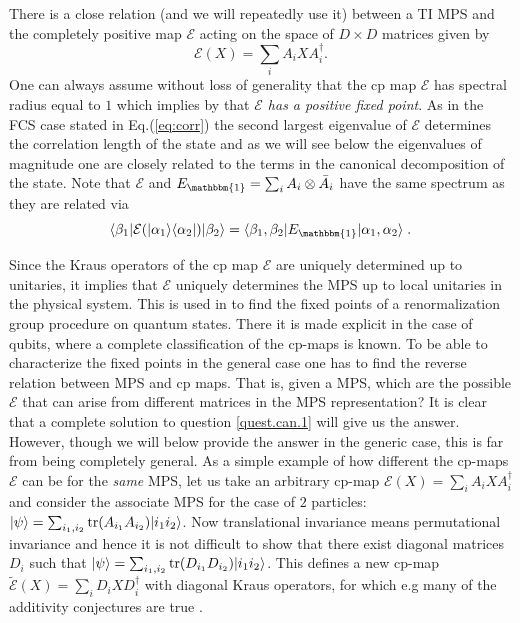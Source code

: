\documentclass[aps,prl,epsfig,graphics,floatfix,mathbbm,a4paper]{article}
\newcommand{\E}{\mathcal{E}}
\newcommand{\1}{\mathbbm{1}}
\renewcommand{\>}{\rangle}
\newcommand{\<}{\langle}
\begin{document}
There is a close relation (and we will repeatedly use it) between
a TI MPS
and the completely positive map $\E$ acting on the space of
$D\times D$ matrices given by
\begin{equation}\label{eq.E}
    \E(X)=\sum_iA_iXA_i^{\dagger}.
\end{equation}
One can always assume without loss of generality that the cp map
$\E$ has spectral radius equal to $1$ which implies by
\cite[Theorem 2.5]{EvansH-Krohn78} that \textit{$\E$ has a
    positive fixed point}. As in the FCS case stated in
Eq.(\ref{eq:corr}) the second largest eigenvalue of $\E$
determines the correlation length of the state and as we will see
below the eigenvalues of magnitude one are closely related to the
terms in the canonical decomposition of the state. Note that $\E$
and $E_\mathbbm{1}=\sum_i A_i\otimes \bar{A}_i$ have the same
spectrum as they are related via \begin{equation}\label{E2E}
    \langle \beta_1|\E(|\alpha_1\rangle\langle
    \alpha_2|)|\beta_2\rangle
    =\langle\beta_1,\beta_2|E_\mathbbm{1}|\alpha_1,\alpha_2\rangle\;.
\end{equation}

Since the Kraus operators of the cp map $\E$ are uniquely
determined up to unitaries, it implies that $\E$ uniquely
determines the MPS up to local unitaries in the physical system.
This is used in \cite{renorm} to find the fixed points of a
renormalization group procedure on quantum states. There it is
made explicit in the case of qubits, where a complete
classification of the cp-maps is known. To be able to characterize
the fixed points in the general case one has to find the reverse
relation between MPS and cp maps. That is, given a MPS, which are
the possible $\E$ that can arise from different matrices in the
MPS representation? It is clear that a complete solution to
question \ref{quest.can.1} will give us the answer. However,
though we will below provide the answer in the generic case, this
is far from being completely general. As a simple example of how
different the cp-maps $\E$ can be for the {\it same} MPS, let us
take an arbitrary cp-map $\E(X)=\sum_iA_iXA_i^{\dagger}$ and
consider the associate MPS for the case of $2$ particles:
$|\psi\rangle=\sum_{i_1,i_2} \operatorname{tr}(A_{i_1}A_{i_2})|i_1
    i_2\rangle$. Now translational invariance means permutational
invariance and hence it is not difficult to show that there exist
diagonal matrices $D_i$ such that $|\psi\rangle=\sum_{i_1,i_2}
    \operatorname{tr}(D_{i_1}D_{i_2})|i_1 i_2\rangle$. This defines a new cp-map
$\tilde{\E}(X)=\sum_iD_iXD_i^{\dagger}$ with diagonal Kraus
operators, for which e.g many of the additivity conjectures are
true \cite{diagonal-krauss}.
\end{document}
